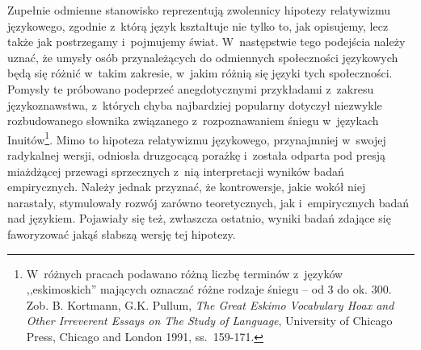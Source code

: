Zupełnie odmienne stanowisko reprezentują zwolennicy hipotezy relatywizmu językowego, zgodnie z~którą język kształtuje nie tylko to, jak opisujemy, lecz także jak postrzegamy i~pojmujemy świat. W~następstwie tego podejścia należy uznać, że umysły osób przynależących do odmiennych społeczności językowych będą się różnić w~takim zakresie, w~jakim różnią się języki tych społeczności. Pomysły te próbowano podeprzeć anegdotycznymi przykładami z~zakresu językoznawstwa, z~których chyba najbardziej popularny dotyczył niezwykle rozbudowanego słownika związanego z~rozpoznawaniem śniegu w~językach Inuitów\footnote{W~różnych pracach podawano różną liczbę terminów z~języków ,,eskimoskich'' mających oznaczać różne rodzaje śniegu -- od 3 do ok. 300. Zob. B. Kortmann, G.K. Pullum, \textit{The Great Eskimo Vocabulary Hoax and Other Irreverent Essays on The Study of Language}, University of Chicago Press, Chicago and London 1991, ss.~159-171.}. Mimo to hipoteza relatywizmu językowego, przynajmniej w~swojej radykalnej wersji, odniosła druzgocącą porażkę i~została odparta pod presją miażdżącej przewagi sprzecznych z~nią interpretacji wyników badań empirycznych. Należy jednak przyznać, że kontrowersje, jakie wokół niej narastały, stymulowały rozwój zarówno teoretycznych, jak i~empirycznych badań nad językiem. Pojawiały się też, zwłaszcza ostatnio, wyniki badań zdające się faworyzować jakąś słabszą wersję tej hipotezy.

